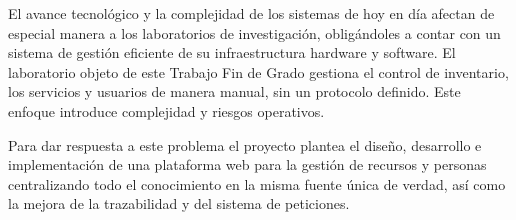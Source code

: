 

El avance tecnológico y la complejidad de los sistemas de hoy en día afectan de especial manera a los laboratorios de investigación, obligándoles a contar con un sistema de gestión eficiente de su infraestructura hardware y software. El laboratorio objeto de este Trabajo Fin de Grado gestiona el control de inventario, los servicios y usuarios de manera manual, sin un protocolo definido. Este enfoque introduce complejidad y riesgos operativos.

Para dar respuesta a este problema el proyecto plantea el diseño, desarrollo e implementación de una plataforma web para la gestión de recursos y personas centralizando todo el conocimiento en la misma fuente única de verdad, así como la mejora de la trazabilidad y del sistema de peticiones.



